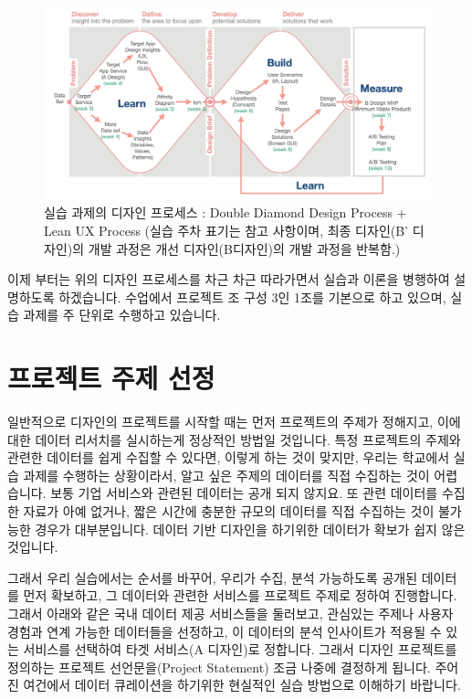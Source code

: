 \documentclass[
  letterpaper,
]{book}
\begin{document}
\begin{figure}[H]

{\centering \includegraphics{img/fig22.png}

}

\caption{실습 과제의 디자인 프로세스 : Double Diamond Design Process +
Lean UX Process (실습 주차 표기는 참고 사항이며, 최종 디자인(B'
디자인)의 개발 과정은 개선 디자인(B디자인)의 개발 과정을 반복함.)}

\end{figure}%

이제 부터는 위의 디자인 프로세스를 차근 차근 따라가면서 실습과 이론을
병행하여 설명하도록 하겠습니다. 수업에서 프로젝트 조 구성 3인 1조를
기본으로 하고 있으며, 실습 과제를 주 단위로 수행하고 있습니다.

\section{프로젝트 주제
선정}\label{uxd504uxb85cuxc81duxd2b8-uxc8fcuxc81c-uxc120uxc815}

일반적으로 디자인의 프로젝트를 시작할 때는 먼저 프로젝트의 주제가
정해지고, 이에 대한 데이터 리서치를 실시하는게 정상적인 방법일 것입니다.
특정 프로젝트의 주제와 관련한 데이터를 쉽게 수집할 수 있다면, 이렇게
하는 것이 맞지만, 우리는 학교에서 실습 과제를 수행하는 상황이라서, 알고
싶은 주제의 데이터를 직접 수집하는 것이 어렵습니다. 보통 기업 서비스와
관련된 데이터는 공개 되지 않지요. 또 관련 데이터를 수집한 자료가 아예
없거나, 짧은 시간에 충분한 규모의 데이터를 직접 수집하는 것이 불가능한
경우가 대부분입니다. 데이터 기반 디자인을 하기위한 데이터가 확보가 쉽지
않은 것입니다.

그래서 우리 실습에서는 순서를 바꾸어, 우리가 수집, 분석 가능하도록
공개된 데이터를 먼저 확보하고, 그 데이터와 관련한 서비스를 프로젝트
주제로 정하여 진행합니다. 그래서 아래와 같은 국내 데이터 제공 서비스들을
둘러보고, 관심있는 주제나 사용자 경험과 연계 가능한 데이터들을 선정하고,
이 데이터의 분석 인사이트가 적용될 수 있는 서비스를 선택하여 타겟
서비스(A 디자인)로 정합니다. 그래서 디자인 프로젝트를 정의하는 프로젝트
선언문을(Project Statement) 조금 나중에 결정하게 됩니다. 주어진 여건에서
데이터 큐레이션을 하기위한 현실적인 실습 방법으로 이해하기 바랍니다.
\end{document}
